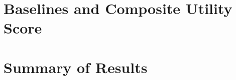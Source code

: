 \section{Baselines and Composite Utility Score}
\label{sec:res-baselines}

%
%

\section{Summary of Results}
\label{sec:res-summary}

%
